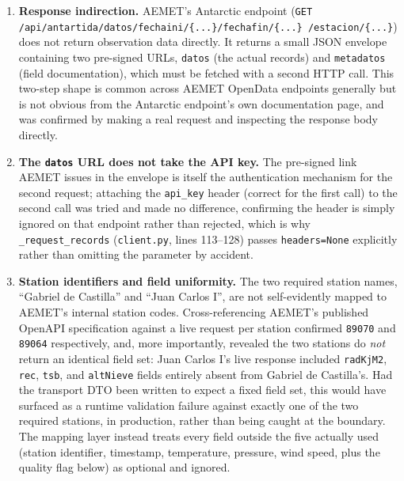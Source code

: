 \documentclass[11pt,a4paper]{article}
\begin{document}
\begin{enumerate}[nosep]
    \item \textbf{Response indirection.} AEMET's Antarctic endpoint
    (\texttt{GET /api/antartida/datos/fechaini/\{...\}/fechafin/\{...\}
    /estacion/\{...\}}) does not return observation data directly. It
    returns a small JSON envelope containing two pre-signed URLs,
    \texttt{datos} (the actual records) and \texttt{metadatos} (field
    documentation), which must be fetched with a second HTTP call. This
    two-step shape is common across AEMET OpenData endpoints generally but
    is not obvious from the Antarctic endpoint's own documentation page,
    and was confirmed by making a real request and inspecting the response
    body directly.
    \item \textbf{The \texttt{datos} URL does not take the API key.} The
    pre-signed link AEMET issues in the envelope is itself the
    authentication mechanism for the second request; attaching the
    \texttt{api\_key} header (correct for the first call) to the second
    call was tried and made no difference, confirming the header is simply
    ignored on that endpoint rather than rejected, which is why
    \texttt{\_request\_records} (\texttt{client.py}, lines 113--128) passes
    \texttt{headers=None} explicitly rather than omitting the parameter by
    accident.
    \item \textbf{Station identifiers and field uniformity.} The two
    required station names, ``Gabriel de Castilla'' and ``Juan Carlos I'',
    are not self-evidently mapped to AEMET's internal station codes.
    Cross-referencing AEMET's published OpenAPI specification against a
    live request per station confirmed \texttt{89070} and \texttt{89064}
    respectively, and, more importantly, revealed the two stations do
    \emph{not} return an identical field set: Juan Carlos I's live response
    included \texttt{radKjM2}, \texttt{rec}, \texttt{tsb}, and
    \texttt{altNieve} fields entirely absent from Gabriel de Castilla's.
    Had the transport DTO been written to expect a fixed field set, this
    would have surfaced as a runtime validation failure against exactly one
    of the two required stations, in production, rather than being caught
    at the boundary. The mapping layer instead treats every field outside
    the five actually used (station identifier, timestamp, temperature,
    pressure, wind speed, plus the quality flag below) as optional and
    ignored.
\end{enumerate}
\end{document}
